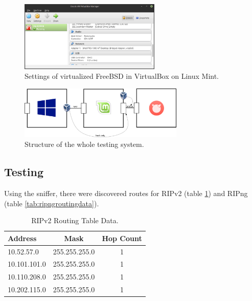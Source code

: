 \documentclass[10pt,a4paper,titlepage]{article}
\begin{document}
            \begin{figure}[h!]
                \begin{center}
                    \includegraphics[width=0.60\textwidth]{mintbsd.png}
                    \caption{Settings of virtualized FreeBSD in VirtualBox on Linux Mint. \label{fig:VBMintBSD}}
                \end{center}
            \end{figure}

            \begin{figure}[h!]
                \begin{center}
                    \includegraphics[width=0.70\textwidth]{programming.png}
                    \caption{Structure of the whole testing system. \label{fig:TestingSystem} \cite{WindowsLogo} \cite{MintLogo} \cite{FreeBSDLogo} \cite{VirtualBoxLogo}}
                \end{center}
            \end{figure}
        
        \newpage
        \subsection{Testing}

            Using the sniffer, there were discovered routes for RIPv2 (table \ref{tab:ripv2routingdata})
            and RIPng (table \ref{tab:ripngroutingdata}).

            \begin{table}[h!]
                \begin{center}
                \begin{tabular}{|lcc|} \hline
                    Address      & Mask          & Hop Count \\ \hline
                    10.52.57.0   & 255.255.255.0 & 1 \\
                    10.101.101.0 & 255.255.255.0 & 1 \\
                    10.110.208.0 & 255.255.255.0 & 1 \\
                    10.202.115.0 & 255.255.255.0 & 1 \\ \hline
                \end{tabular}
                \caption{RIPv2 Routing Table Data. \label{tab:ripv2routingdata}}
                \end{center}
            \end{table}
\end{document}

